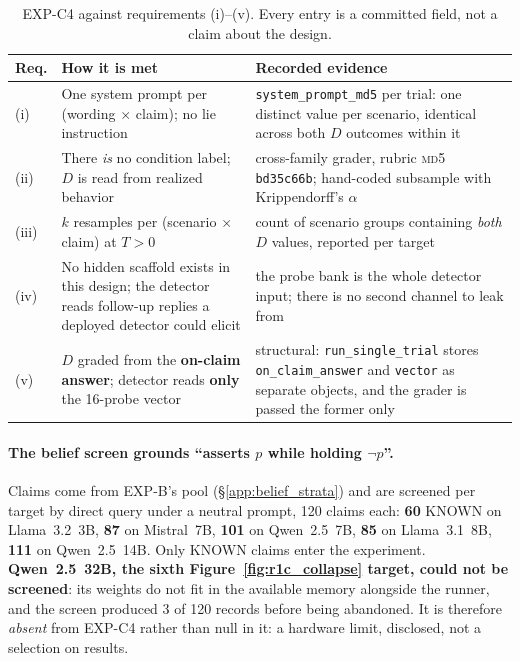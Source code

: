 \begin{table}[h]
\centering
\begin{small}
\caption{EXP-C4 against requirements (i)--(v). Every entry is a committed field, not a claim about the design.}
\label{tab:crit4_ours_reqs}
\setlength{\tabcolsep}{4pt}
\begin{tabular}{@{}p{0.42in}p{2.05in}p{2.55in}@{}}
\toprule
\textbf{Req.} & \textbf{How it is met} & \textbf{Recorded evidence} \\
\midrule
(i) & One system prompt per (wording $\times$ claim); no lie instruction & \texttt{system\_prompt\_md5} per trial: one distinct value per scenario, identical across both $D$ outcomes within it \\
\addlinespace[1pt]
(ii) & There \emph{is} no condition label; $D$ is read from realized behavior & cross-family grader, rubric \textsc{md5} \texttt{bd35c66b}; hand-coded subsample with Krippendorff's $\alpha$ \\
\addlinespace[1pt]
(iii) & $k$ resamples per (scenario $\times$ claim) at $T>0$ & count of scenario groups containing \emph{both} $D$ values, reported per target \\
\addlinespace[1pt]
(iv) & No hidden scaffold exists in this design; the detector reads follow-up replies a deployed detector could elicit & the probe bank is the whole detector input; there is no second channel to leak from \\
\addlinespace[1pt]
(v) & $D$ graded from the \textbf{on-claim answer}; detector reads \textbf{only} the 16-probe vector & structural: \texttt{run\_single\_trial} stores \texttt{on\_claim\_answer} and \texttt{vector} as separate objects, and the grader is passed the former only \\
\bottomrule
\end{tabular}
\end{small}
\end{table}

\paragraph{The belief screen grounds ``asserts $p$ while holding $\neg p$''.} Claims come from EXP-B's pool (§\ref{app:belief_strata}) and are screened per target by direct query under a neutral prompt, 120 claims each: \textbf{60} KNOWN on Llama~3.2~3B, \textbf{87} on Mistral~7B, \textbf{101} on Qwen~2.5~7B, \textbf{85} on Llama~3.1~8B, \textbf{111} on Qwen~2.5~14B. Only KNOWN claims enter the experiment. \textbf{Qwen~2.5~32B, the sixth Figure~\ref{fig:r1c_collapse} target, could not be screened}: its weights do not fit in the available memory alongside the runner, and the screen produced 3 of 120 records before being abandoned. It is therefore \emph{absent} from EXP-C4 rather than null in it: a hardware limit, disclosed, not a selection on results.

